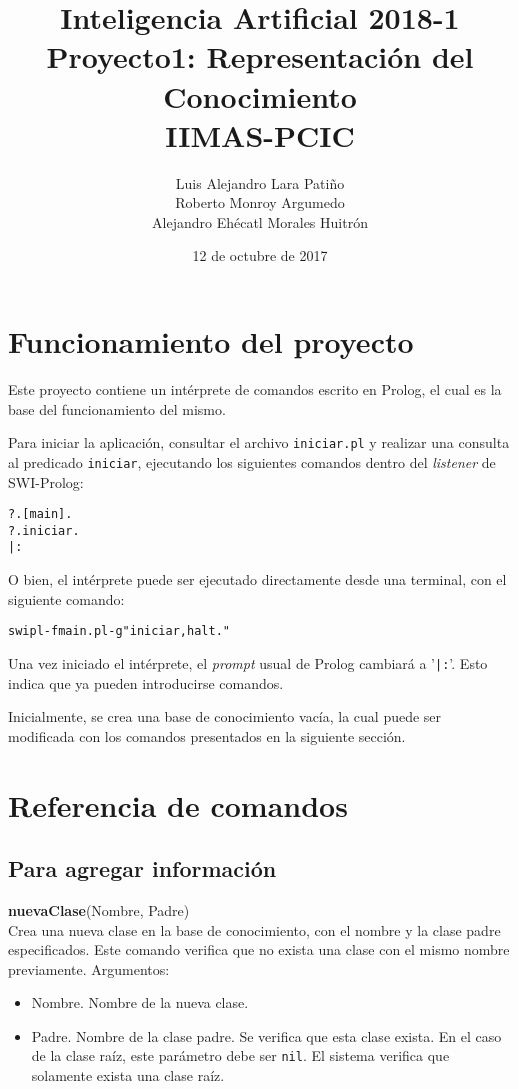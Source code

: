 \documentclass[11pt]{article}
\title{Inteligencia Artificial 2018-1 \\ Proyecto1: Representación del Conocimiento\\
\small{IIMAS-PCIC}}
\author{Luis Alejandro Lara Patiño\\Roberto Monroy Argumedo\\
Alejandro Ehécatl Morales Huitrón}
\date{12 de octubre de 2017}
\newcommand{\bt}{\begin{alltt}}
\newcommand{\et}{\end{alltt}}
\newcommand{\comando}[2]{
    \textbf{#1}(#2)\\
}
\newenvironment{args}{
    \newline
    Argumentos:
    \begin{itemize}
}{
    \end{itemize}
    \bigskip
}
\begin{document}
\maketitle

\section{Funcionamiento del proyecto}

Este proyecto contiene un intérprete de comandos escrito en Prolog, el cual es la base del funcionamiento del mismo.

Para iniciar la aplicación, consultar el archivo \texttt{iniciar.pl} y realizar una consulta al predicado \texttt{iniciar}, ejecutando los siguientes comandos dentro del \textit{listener} de SWI-Prolog:

\bt
?. [main].
?. iniciar.
|:
\et

O bien, el intérprete puede ser ejecutado directamente desde una terminal, con el siguiente comando:

\bt
swipl -f main.pl -g "iniciar, halt."
\et

Una vez iniciado el intérprete, el \textit{prompt} usual de Prolog cambiará a '\texttt{|:}'. Esto indica que ya pueden introducirse comandos.

Inicialmente, se crea una base de conocimiento vacía, la cual puede ser modificada con los comandos presentados en la siguiente sección.

\section{Referencia de comandos}

\subsection{Para agregar información}

\comando{nuevaClase}{Nombre, Padre}
Crea una nueva clase en la base de conocimiento, con el nombre y la clase padre especificados. Este comando verifica que no exista una clase con el mismo nombre previamente.
\begin{args}
    \item Nombre. Nombre de la nueva clase.
    \item Padre. Nombre de la clase padre. Se verifica que esta clase exista. En el caso de la clase raíz, este parámetro debe ser \texttt{nil}. El sistema verifica que solamente exista una clase raíz.
\end{args}
\end{document}

